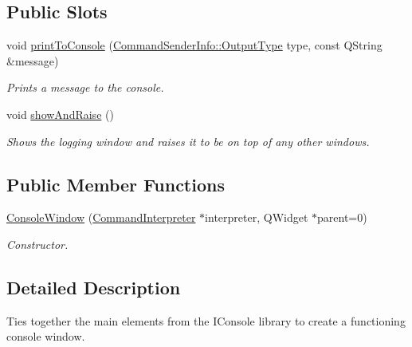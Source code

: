 \subsection*{Public Slots}
\begin{DoxyCompactItemize}
\item 
void \hyperlink{class_console_window_ae9673d9006ba0e1d31d6432ae590ff6e}{print\-To\-Console} (\hyperlink{class_command_sender_info_a3a5e6a2ef1772f6557f351652c2e3b60}{Command\-Sender\-Info\-::\-Output\-Type} type, const Q\-String \&message)
\begin{DoxyCompactList}\small\item\em Prints a message to the console. \end{DoxyCompactList}\item 
\hypertarget{class_console_window_a94b2b50c6896d6ebea168a5aac29a5fa}{void \hyperlink{class_console_window_a94b2b50c6896d6ebea168a5aac29a5fa}{show\-And\-Raise} ()}\label{class_console_window_a94b2b50c6896d6ebea168a5aac29a5fa}

\begin{DoxyCompactList}\small\item\em Shows the logging window and raises it to be on top of any other windows. \end{DoxyCompactList}\end{DoxyCompactItemize}
\subsection*{Public Member Functions}
\begin{DoxyCompactItemize}
\item 
\hyperlink{class_console_window_af6b333d802186fc620a66563f415e89c}{Console\-Window} (\hyperlink{class_command_interpreter}{Command\-Interpreter} $\ast$interpreter, Q\-Widget $\ast$parent=0)
\begin{DoxyCompactList}\small\item\em Constructor. \end{DoxyCompactList}\end{DoxyCompactItemize}


\subsection{Detailed Description}
Ties together the main elements from the I\-Console library to create a functioning console window. 

